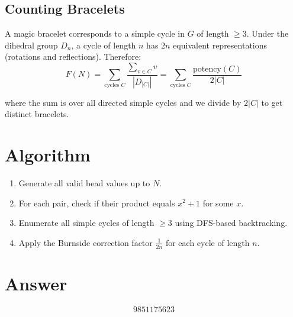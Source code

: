 \documentclass[12pt]{article}
\begin{document}
\subsection{Counting Bracelets}

A magic bracelet corresponds to a simple cycle in $G$ of length $\geq 3$. Under the dihedral group $D_n$, a cycle of length $n$ has $2n$ equivalent representations (rotations and reflections). Therefore:
\[
F(N) = \sum_{\text{cycles } C} \frac{\sum_{v \in C} v}{|D_{|C|}|} = \sum_{\text{cycles } C} \frac{\text{potency}(C)}{2|C|}
\]

where the sum is over all directed simple cycles and we divide by $2|C|$ to get distinct bracelets.

\section{Algorithm}

\begin{enumerate}
    \item Generate all valid bead values up to $N$.
    \item For each pair, check if their product equals $x^2 + 1$ for some $x$.
    \item Enumerate all simple cycles of length $\geq 3$ using DFS-based backtracking.
    \item Apply the Burnside correction factor $\frac{1}{2n}$ for each cycle of length $n$.
\end{enumerate}

\section{Answer}

\[
\boxed{9851175623}
\]
\end{document}
